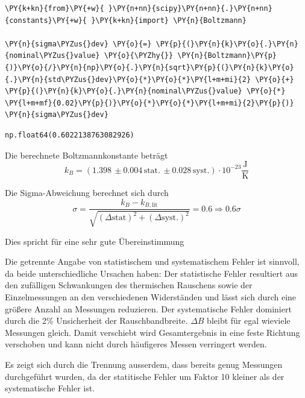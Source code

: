     \begin{tcolorbox}[breakable, size=fbox, boxrule=1pt, pad at break*=1mm,colback=cellbackground, colframe=cellborder]
\begin{Verbatim}[commandchars=\\\{\}]
\PY{k+kn}{from}\PY{+w}{ }\PY{n+nn}{scipy}\PY{n+nn}{.}\PY{n+nn}{constants}\PY{+w}{ }\PY{k+kn}{import} \PY{n}{Boltzmann}

\PY{n}{sigma\PYZus{}dev} \PY{o}{=} \PY{p}{(}\PY{n}{k}\PY{o}{.}\PY{n}{nominal\PYZus{}value} \PY{o}{\PYZhy{}} \PY{n}{Boltzmann}\PY{p}{)}\PY{o}{/}\PY{n}{np}\PY{o}{.}\PY{n}{sqrt}\PY{p}{(}\PY{n}{k}\PY{o}{.}\PY{n}{std\PYZus{}dev}\PY{o}{*}\PY{o}{*}\PY{l+m+mi}{2} \PY{o}{+} \PY{p}{(}\PY{n}{k}\PY{o}{.}\PY{n}{nominal\PYZus{}value} \PY{o}{*} \PY{l+m+mf}{0.02}\PY{p}{)}\PY{o}{*}\PY{o}{*}\PY{l+m+mi}{2}\PY{p}{)}
\PY{n}{sigma\PYZus{}dev}
\end{Verbatim}
\end{tcolorbox}

            \begin{tcolorbox}[breakable, size=fbox, boxrule=.5pt, pad at break*=1mm, opacityfill=0]
\begin{Verbatim}[commandchars=\\\{\}]
np.float64(0.6022138763082926)
\end{Verbatim}
\end{tcolorbox}
        
\bigskip
\begin{resultbox}[Ergebnis]
Die berechnete Boltzmannkonstante beträgt
\[ k_B = (1.398\,\pm0.004\,\text{stat.}\,\pm 0.028\,\text{syst.}) \cdot 10^{-23} \frac{\text{J}}{\text{K}}\]

Die Sigma-Abweichung berechnet sich durch
\[ \sigma = \frac{k_B - k_{B,\text{lit}}}{\sqrt{(\Delta \text{stat})^2 + (\Delta \text{syst.})^2}} = 0.6 \Rightarrow 0.6\sigma \]
\end{resultbox}

Dies spricht für eine sehr gute Übereinstimmung

Die getrennte Angabe von statistischem und systematischem Fehler ist
sinnvoll, da beide unterschiedliche Ursachen haben: Der statistische
Fehler resultiert aus den zufälligen Schwankungen des thermischen
Rauschens sowie der Einzelmessungen an den verschiedenen Widerständen
und lässt sich durch eine größere Anzahl an Messungen reduzieren. Der
systematische Fehler dominiert durch die 2\% Unsicherheit der
Rauschbandbreite. \(\Delta B\) bleibt für egal wieviele Messungen
gleich. Damit verschiebt wird Gesamtergebnis in eine feste Richtung
verschoben und kann nicht durch häufigeres Messen verringert werden.

Es zeigt sich durch die Trennung ausserdem, dass bereits genug Messungen
durchgeführt wurden, da der statitische Fehler um Faktor 10 kleiner als
der systematische Fehler ist.


    
    
    


